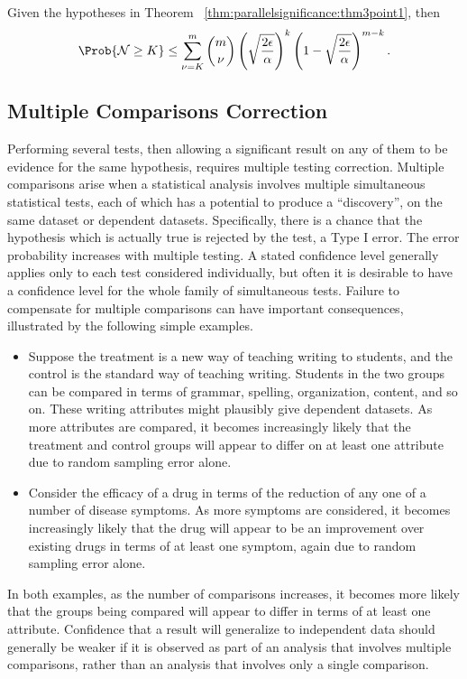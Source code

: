 \documentclass[12pt]{article}
\begin{document}
\begin{corollary}
    Given the hypotheses in Theorem~%
    \ref{thm:parallelsignificance:thm3point1}, then
    \[
        \Prob{\mathcal{N} \ge K} \le \sum\limits_{\nu=K}^m \binom{m}{\nu}
        \left( \sqrt{\frac{2\epsilon}{\alpha}} \right)^{k} \left( 1 -
        \sqrt{\frac{2\epsilon}{\alpha}} \right)^{m-k}.
    \]
\end{corollary}

\subsection*{Multiple Comparisons Correction}

Performing several tests, then allowing a significant result on any of
them to be evidence for the same hypothesis, requires multiple testing
correction.  Multiple comparisons%
arise when a statistical analysis involves multiple simultaneous
statistical tests, each of which has a potential to produce a
``discovery'', on the same dataset or dependent datasets.  Specifically,
there is a chance that the hypothesis which is actually true is rejected
by the test, a Type I error.  The error probability increases with
multiple testing.  A stated confidence level generally applies only to
each test considered individually, but often it is desirable to have a
confidence level for the whole family of simultaneous tests.  Failure to
compensate for multiple comparisons can have important consequences,
illustrated by the following simple examples.
\begin{itemize}
    \item
        Suppose the treatment is a new way of teaching writing to
        students, and the control is the standard way of teaching
        writing.  Students in the two groups can be compared in terms of
        grammar, spelling, organization, content, and so on.  These
        writing attributes might plausibly give dependent datasets.  As
        more attributes are compared, it becomes increasingly likely
        that the treatment and control groups will appear to differ on
        at least one attribute due to random sampling error alone.
    \item
        Consider the efficacy of a drug in terms of the reduction of any
        one of a number of disease symptoms.  As more symptoms are
        considered, it becomes increasingly likely that the drug will
        appear to be an improvement over existing drugs in terms of at
        least one symptom, again due to random sampling error alone.
\end{itemize}
In both examples, as the number of comparisons increases, it becomes
more likely that the groups being compared will appear to differ in
terms of at least one attribute.  Confidence that a result will
generalize to independent data should generally be weaker if it is
observed as part of an analysis that involves multiple comparisons,
rather than an analysis that involves only a single comparison.
\end{document}
